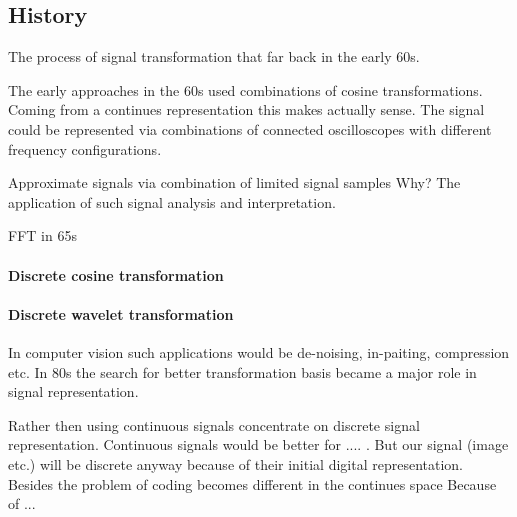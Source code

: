 \subsection{History}
\label{sec:history}
The process of signal transformation that far back in the early 60s.\cite{Rubinstein2010}

The early approaches in the 60s used combinations of cosine transformations. Coming from a continues representation this makes 
actually sense. The signal could be represented via combinations of connected oscilloscopes with different frequency configurations. 

Approximate signals via combination of limited signal samples
Why?
The application of such signal analysis and interpretation.


FFT in 65s



\paragraph{Discrete cosine transformation}
\Todo{}

\paragraph{Discrete wavelet transformation}
\Todo{}

In computer vision such applications would be de-noising, in-paiting, compression etc.
In 80s the search for better transformation basis became a major role in signal representation. \cite{}

Rather then using continuous signals concentrate on discrete signal representation.
Continuous signals would be better for .... . 
But our signal (image etc.) will be discrete anyway because of their initial digital representation. 
Besides the problem of coding becomes different in the continues space \cite{} Because of ...


